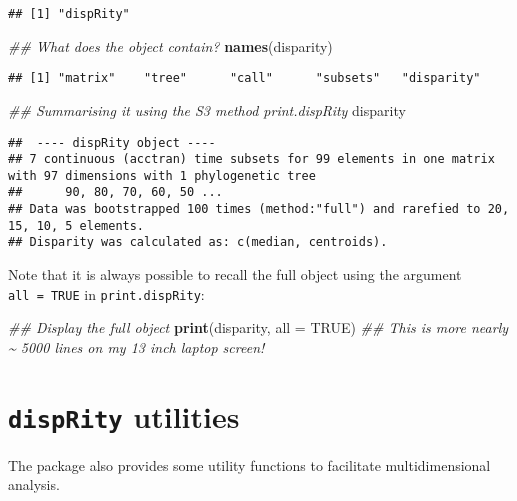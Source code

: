 \documentclass[
]{book}
\newenvironment{Shaded}{\begin{snugshade}}{\end{snugshade}}
\newcommand{\CommentTok}[1]{\textcolor[rgb]{0.56,0.35,0.01}{\textit{#1}}}
\newcommand{\DataTypeTok}[1]{\textcolor[rgb]{0.13,0.29,0.53}{#1}}
\newcommand{\KeywordTok}[1]{\textcolor[rgb]{0.13,0.29,0.53}{\textbf{#1}}}
\newcommand{\NormalTok}[1]{#1}
\newcommand{\OtherTok}[1]{\textcolor[rgb]{0.56,0.35,0.01}{#1}}
\begin{document}
\begin{verbatim}
## [1] "dispRity"
\end{verbatim}

\begin{Shaded}
\begin{Highlighting}[]
\CommentTok{\#\# What does the object contain?}
\KeywordTok{names}\NormalTok{(disparity)}
\end{Highlighting}
\end{Shaded}

\begin{verbatim}
## [1] "matrix"    "tree"      "call"      "subsets"   "disparity"
\end{verbatim}

\begin{Shaded}
\begin{Highlighting}[]
\CommentTok{\#\# Summarising it using the S3 method print.dispRity}
\NormalTok{disparity}
\end{Highlighting}
\end{Shaded}

\begin{verbatim}
##  ---- dispRity object ---- 
## 7 continuous (acctran) time subsets for 99 elements in one matrix with 97 dimensions with 1 phylogenetic tree
##      90, 80, 70, 60, 50 ...
## Data was bootstrapped 100 times (method:"full") and rarefied to 20, 15, 10, 5 elements.
## Disparity was calculated as: c(median, centroids).
\end{verbatim}

Note that it is always possible to recall the full object using the argument \texttt{all\ =\ TRUE} in \texttt{print.dispRity}:

\begin{Shaded}
\begin{Highlighting}[]
\CommentTok{\#\# Display the full object}
\KeywordTok{print}\NormalTok{(disparity, }\DataTypeTok{all =} \OtherTok{TRUE}\NormalTok{)}
\CommentTok{\#\# This is more nearly \textasciitilde{} 5000 lines on my 13 inch laptop screen!}
\end{Highlighting}
\end{Shaded}

\hypertarget{utilities}{%
\section{\texorpdfstring{\texttt{dispRity} utilities}{dispRity utilities}}\label{utilities}}

The package also provides some utility functions to facilitate multidimensional analysis.
\end{document}
